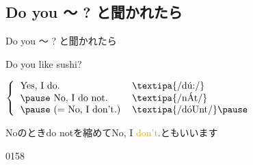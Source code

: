 \documentclass[aspectratio=169,dvipsnames]{beamer}
\newcommand{\myaudio}[1]{\href{#1}{\faVolumeUp}}
\begin{document}
\subsection{Do you 〜 ? と聞かれたら}
\begin{frame}[plain]{Do you 〜 ? と聞かれたら}
 \large

Do you like sushi?\hfill{}\pause

\vspace{20pt}

\mbox{}\hspace{100pt}$\left\{\begin{tabular}{ll}
         \text{Yes, I do.}&\text{\textipa{/d\'u:/}}\\\pause
         \text{No, I do not.}&\text{\textipa{/n\'At/}}\\\pause
         \text{(}= \text{No, I don't.)}&\text{\textipa{/d\'oUnt/}}\pause
        \end{tabular}\right.$

\mbox{}\hfill{}{\small Noのときdo notを縮めてNo, I \textcolor{orange}{don't}.ともいいます}

\hfill{\tiny 0158}\,{\scriptsize \myaudio{./audio/011_answer_do_01.mp3}}
\end{frame}
\end{document}
